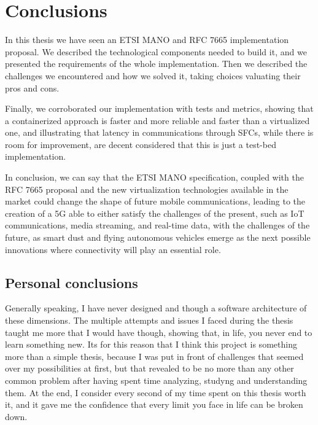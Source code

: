 \chapter{Conclusions}
\label{chap:conclusions}

In this thesis we have seen an ETSI MANO and RFC 7665 implementation proposal. 
We described the technological components needed to build it, and we presented 
the requirements of the whole implementation. Then we described the challenges 
we encountered and how we solved it, taking choices valuating their pros and 
cons.

Finally, we corroborated our implementation with tests and metrics, showing 
that a containerized approach is faster and more reliable and faster than a 
virtualized one, and illustrating that latency in communications through SFCs, 
while there is room for improvement, are decent considered that this is just 
a test-bed implementation.

In conclusion, we can say that the ETSI MANO specification, coupled with the 
RFC 7665 proposal and the new virtualization technologies available in the 
market could change the shape of future mobile communications, leading to the 
creation of a 5G able to either satisfy the challenges of the present, such as 
IoT communications, media streaming, and real-time data, with the challenges of 
the future, as smart dust and flying autonomous vehicles emerge as the next 
possible innovations where connectivity will play an essential role.

\section*{Personal conclusions}

Generally speaking, I have never designed and though a software architecture of
these dimensions. The multiple attempts and issues I faced during the thesis
taught me more that I would have though, showing that, in life, you never end to
learn something new. Its for this reason that I think this project is something
more than a simple thesis, because I was put in front of challenges that seemed
over my possibilities at first, but that revealed to be no more than any other
common problem after having spent time analyzing, studyng and understanding
them. At the end, I consider every second of my time spent on this thesis worth
it, and it gave me the confidence that every limit you face in life can be
broken down.
